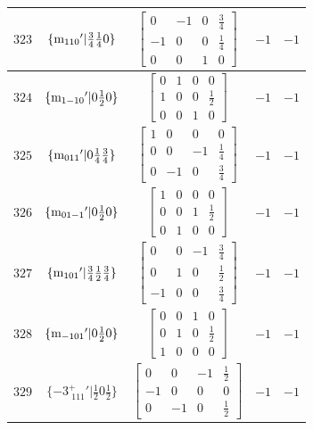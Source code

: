 \documentclass[fleqn,8pt]{jsarticle}
\begin{document}
\begin{longtable}{ccccc}
$ 323 $ & $ \{{\rm m}_{110}{}'|\frac{3}{4} \frac{1}{4} 0\} $ & $ \begin{bmatrix} 0 & -1 & 0 & \frac{3}{4} \\ -1 & 0 & 0 & \frac{1}{4} \\ 0 & 0 & 1 & 0 \end{bmatrix} $ & $ -1 $ & $ -1 $ \\ \hline
$ 324 $ & $ \{{\rm m}_{1-10}{}'|0 \frac{1}{2} 0\} $ & $ \begin{bmatrix} 0 & 1 & 0 & 0 \\ 1 & 0 & 0 & \frac{1}{2} \\ 0 & 0 & 1 & 0 \end{bmatrix} $ & $ -1 $ & $ -1 $ \\ \hline
$ 325 $ & $ \{{\rm m}_{011}{}'|0 \frac{1}{4} \frac{3}{4}\} $ & $ \begin{bmatrix} 1 & 0 & 0 & 0 \\ 0 & 0 & -1 & \frac{1}{4} \\ 0 & -1 & 0 & \frac{3}{4} \end{bmatrix} $ & $ -1 $ & $ -1 $ \\ \hline
$ 326 $ & $ \{{\rm m}_{01-1}{}'|0 \frac{1}{2} 0\} $ & $ \begin{bmatrix} 1 & 0 & 0 & 0 \\ 0 & 0 & 1 & \frac{1}{2} \\ 0 & 1 & 0 & 0 \end{bmatrix} $ & $ -1 $ & $ -1 $ \\ \hline
$ 327 $ & $ \{{\rm m}_{101}{}'|\frac{3}{4} \frac{1}{2} \frac{3}{4}\} $ & $ \begin{bmatrix} 0 & 0 & -1 & \frac{3}{4} \\ 0 & 1 & 0 & \frac{1}{2} \\ -1 & 0 & 0 & \frac{3}{4} \end{bmatrix} $ & $ -1 $ & $ -1 $ \\ \hline
$ 328 $ & $ \{{\rm m}_{-101}{}'|0 \frac{1}{2} 0\} $ & $ \begin{bmatrix} 0 & 0 & 1 & 0 \\ 0 & 1 & 0 & \frac{1}{2} \\ 1 & 0 & 0 & 0 \end{bmatrix} $ & $ -1 $ & $ -1 $ \\ \hline
$ 329 $ & $ \{-3^{+}_{\,\,111}{}'|\frac{1}{2} 0 \frac{1}{2}\} $ & $ \begin{bmatrix} 0 & 0 & -1 & \frac{1}{2} \\ -1 & 0 & 0 & 0 \\ 0 & -1 & 0 & \frac{1}{2} \end{bmatrix} $ & $ -1 $ & $ -1 $ \\ \hline

\end{longtable}
\end{document}
